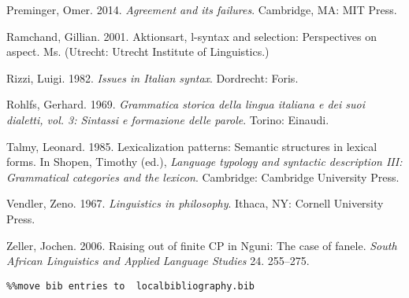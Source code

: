 \documentclass[output=paper]{langsci/langscibook}
\begin{document}
Preminger, Omer. 2014. \textit{Agreement and its failures}. Cambridge, MA: MIT Press. 

Ramchand, Gillian. 2001. Aktionsart, l-syntax and selection: Perspectives on aspect. Ms. (Utrecht: Utrecht Institute of Linguistics.)

Rizzi, Luigi. 1982. \textit{Issues in Italian syntax}. Dordrecht: Foris.

Rohlfs, Gerhard. 1969. \textit{Grammatica storica della lingua italiana e dei suoi dialetti, vol. 3: Sintassi e formazione delle parole}. Torino: Einaudi.

Talmy, Leonard. 1985. Lexicalization patterns: Semantic structures in lexical forms. In Shopen, Timothy (ed.), \textit{Language typology and syntactic description III: Grammatical categories and the lexicon}. Cambridge: Cambridge University Press.

Vendler, Zeno. 1967. \textit{Linguistics in philosophy}. Ithaca, NY: Cornell University Press.

Zeller, Jochen. 2006. Raising out of finite CP in Nguni: The case of fanele. \textit{South African Linguistics and Applied Language Studies} 24. 255–275.


\begin{verbatim}%%move bib entries to  localbibliography.bib
\end{verbatim} 

\sloppy
\printbibliography[heading=subbibliography,notkeyword=this] 
\end{document}
